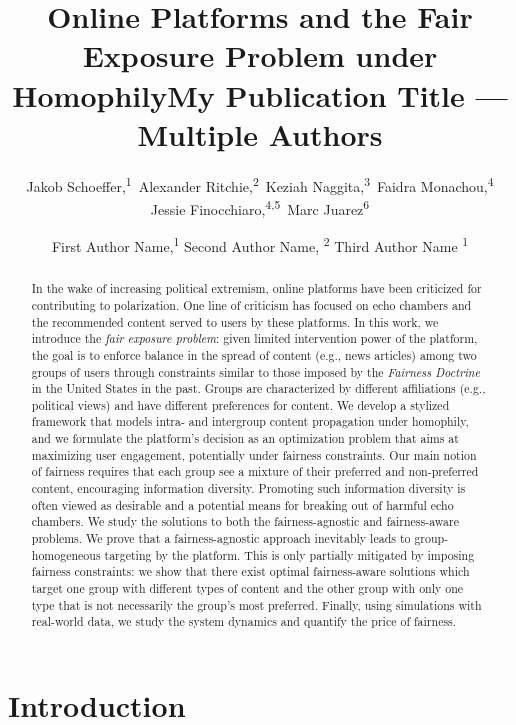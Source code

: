 \documentclass[letterpaper]{article} %
\title{Online Platforms and the Fair Exposure Problem under Homophily}
\author{
    Jakob Schoeffer,\textsuperscript{\rm 1}\equalcontrib\ 
    Alexander Ritchie,\textsuperscript{\rm 2}\equalcontrib\ 
    Keziah Naggita,\textsuperscript{\rm 3}\equalcontrib\ 
    Faidra Monachou,\textsuperscript{\rm 4}\equalcontrib\\
    Jessie Finocchiaro,\textsuperscript{\rm 4,\rm 5}\equalcontrib\ 
    Marc Juarez\textsuperscript{\rm 6}
}
\title{My Publication Title --- Multiple Authors}
\author {
    First Author Name,\textsuperscript{\rm 1}
    Second Author Name, \textsuperscript{\rm 2}
    Third Author Name \textsuperscript{\rm 1}
}
\begin{document}
\maketitle

\begin{abstract}
    In the wake of increasing political extremism, online platforms have been criticized for contributing to polarization.
    One line of criticism has focused on echo chambers and the recommended content served to users by these platforms.
    In this work, we introduce the \textit{fair exposure problem}: given limited intervention power of the platform, the goal is to enforce balance in the spread of content (e.g., news articles) among two groups of users through constraints similar to those imposed by the \emph{Fairness Doctrine} in the United States in the past.
    Groups are characterized by different affiliations (e.g., political views) and have different preferences for content.
    We develop a stylized framework that models intra- and intergroup content propagation under homophily, and we formulate the platform's decision as an optimization problem that aims at maximizing user engagement, potentially under fairness constraints.
    Our main notion of fairness requires that each group see a mixture of their preferred and non-preferred content, encouraging information diversity.
    Promoting such information diversity is often viewed as desirable and a potential means for breaking out of harmful echo chambers.
    We study the solutions to both the fairness-agnostic and fairness-aware problems. We prove that a fairness-agnostic approach inevitably leads to group-homogeneous targeting  by the platform.
    This is only partially mitigated by imposing fairness constraints: we show that there exist optimal fairness-aware solutions which target one group with different types of content and the other group with only one type that is not necessarily the group's most preferred.
    Finally, using simulations with real-world data, we study the system dynamics and quantify the price of fairness.
\end{abstract}

\section{Introduction}\label{sec:introduction}
\end{document}
